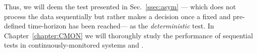 Thus, we will deem the test presented in Sec.~\ref{ssec:asym} --- which does not process the data sequentially but rather makes a decision once a fixed and pre-defined time-horizon has been reached--- as the \textit{deterministic} test. In Chapter~\ref{chapter:CMON} we will thoroughly study the performance of sequential tests in continuously-monitored systems and .
